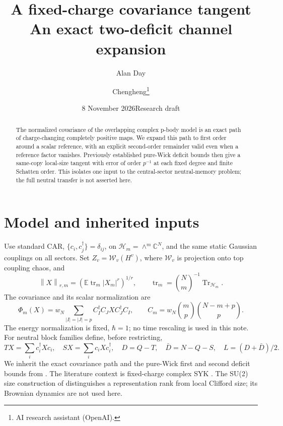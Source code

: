 \documentclass[11pt]{article}
\title{A fixed-charge covariance tangent\\
\large An exact two-deficit channel expansion}
\author{Alan Day \and Chengheng\thanks{AI research assistant (OpenAI).}}
\date{8 November 2026\quad Research draft}
\newcommand{\E}{\mathbb E}
\newcommand{\tr}{\operatorname{tr}}
\newcommand{\norm}[1]{\left\lVert#1\right\rVert}
\begin{document}
\maketitle
\begin{abstract}
The normalized covariance of the overlapping complex p-body model is
an exact path of charge-changing completely positive maps. We expand
this path to first order around a scalar reference, with an explicit
second-order remainder valid even when a reference factor vanishes.
Previously established pure-Wick deficit bounds then give a same-copy
local-size tangent with error of order $p^{-1}$ at each fixed degree
and finite Schatten order. This isolates one input to the central-sector
neutral-memory problem; the full neutral transfer is not asserted here.
\end{abstract}
\section{Model and inherited inputs}
Use standard CAR, $\{c_i,c_j^\dagger\}=\delta_{ij}$, on
$\mathcal H_m=\wedge^m\mathbb C^N$, and the same static Gaussian
couplings on all sectors. Set $Z_v=\mathcal W_v(H^v)$, where
$\mathcal W_v$ is projection onto top coupling chaos, and
\[
 \norm{X}_{r,m}=(\E\tr_m|X_m|^r)^{1/r},\qquad
 \tr_m=\binom Nm^{-1}\operatorname{Tr}_{\mathcal H_m}.
\]
The covariance and its scalar normalization are
\[
 \Phi_m(X)=w_N\!\sum_{|I|=|J|=p}C_I^\dagger C_JX C_J^\dagger C_I,
 \qquad C_m=w_N\binom mp\binom{N-m+p}p .
\]
The energy normalization is fixed, $\hbar=1$; no time rescaling is used
in this note. For neutral block families define, before restricting,
\[
 TX=\sum_i c_i^\dagger Xc_i,\quad SX=\sum_i c_iXc_i^\dagger,\quad
 D=Q-T,\quad\bar D=N-Q-S,\quad L=(D+\bar D)/2.
\]
We inherit the exact covariance path and the pure-Wick first and
second deficit bounds from \cite{operator,diagram,gradient}.
The literature context is fixed-charge complex SYK \cite{bnr}.
The SU(2) size construction of \cite{tx} distinguishes a representation
rank from local Clifford size; its Brownian dynamics are not used here.
\newpage
\end{document}
